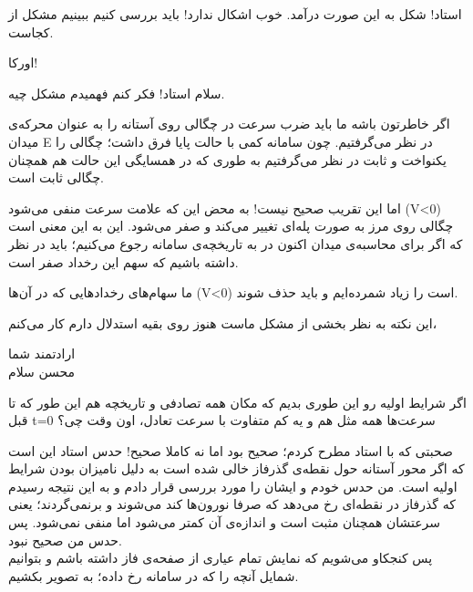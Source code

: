 \begin{meeting}
	استاد! شکل  به این صورت درآمد.
	\medskip
	خوب اشکال ندارد! باید بررسی کنیم ببینیم مشکل از کجاست.
\end{meeting}
\begin{mohsenletter}
	اورکا!
	
	سلام استاد!
	فکر کنم فهمیدم مشکل چیه.
	
	اگر خاطرتون باشه ما باید ضرب سرعت در چگالی روی آستانه را به عنوان محرکه‌ی میدان E در نظر می‌گرفتیم. چون سامانه کمی با حالت پایا فرق داشت؛ چگالی را یکنواخت و ثابت در نظر می‌گرفتیم به طوری که در همسایگی این حالت هم همچنان چگالی ثابت است.
	
	اما این تقریب صحیح نیست! به محض این که علامت سرعت منفی می‌شود (V<0) چگالی روی مرز به صورت پله‌ای تغییر می‌کند و صفر می‌شود. این به این معنی است که اگر برای محاسبه‌ی میدان اکنون در به تاریخچه‌ی سامانه رجوع می‌کنیم؛ باید در نظر داشته باشیم که سهم این رخداد صفر است.
	
	ما سهام‌های رخدادهایی که در آن‌ها  (V<0) است را زیاد شمرده‌ایم و باید حذف شوند.
	
	این نکته به نظر بخشی از مشکل ماست هنوز روی بقیه استدلال دارم کار می‌کنم،
	
	ارادتمند شما\\
	محسن
		\medskip
	سلام
	
	اگر شرایط اولیه رو این طوری بدیم که مکان همه تصادفی و تاریخچه‌ هم این طور که تا قبل t=0 سرعت‌ها همه مثل هم و یه کم متفاوت با سرعت تعادل، اون وقت چی؟
\end{mohsenletter}

صحبتی که با استاد مطرح کردم؛ صحیح بود اما نه کاملا صحیح! حدس استاد این است که اگر محور آستانه حول نقطه‌ی گذرفاز خالی شده است به دلیل نامیزان بودن شرایط اولیه است. من حدس خودم و ایشان را مورد بررسی قرار دادم و به این نتیجه رسیدم که گذرفاز در نقطه‌ای رخ می‌دهد که صرفا نورون‌ها کند می‌شوند و برنمی‌گردند؛ یعنی سرعتشان همچنان مثبت است و اندازه‌ی آن کمتر می‌شود اما منفی نمی‌شود. پس حدس من صحیح نبود.\\
پس کنجکاو می‌شویم که نمایش تمام عیاری از صفحه‌ی فاز داشته باشم و بتوانیم شمایل آنچه را که در سامانه رخ داده؛ به تصویر بکشیم.

